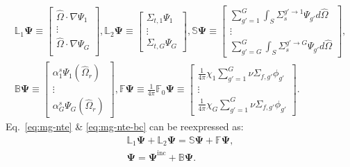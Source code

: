 \documentclass[letterpaper]{mc2025}
\begin{document}
\begin{gather}
  \mathbb{L}_1\bm{\Psi} \equiv
  \begin{bmatrix}
    \hat{\Omega}\cdot\nabla\Psi_1 \\
    \vdots \\
    \hat{\Omega}\cdot\nabla\Psi_G \\
  \end{bmatrix},
  \mathbb{L}_2\bm{\Psi} \equiv
  \begin{bmatrix}
    \Sigma_{t,1}\Psi_1 \\
    \vdots \\
    \Sigma_{t,G}\Psi_G
  \end{bmatrix},
  \mathbb{S}\bm{\Psi} \equiv
  \begin{bmatrix}
    \sum^G_{g'=1}\int_S \Sigma_s^{g'\rightarrow 1}\Psi_{g'}d\hat{\Omega} \\
    \vdots \\
    \sum^G_{g'=G}\int_S \Sigma_s^{g'\rightarrow G}\Psi_{g'}d\hat{\Omega}
  \end{bmatrix}, \nonumber \\
  \mathbb{B}\bm{\Psi} \equiv
  \begin{bmatrix}
    \alpha^s_1\Psi_1(\hat{\Omega}_r) \\
    \vdots \\
    \alpha^s_G\Psi_G(\hat{\Omega}_r)
  \end{bmatrix},
  \mathbb{F}\bm{\Psi} \equiv \frac{1}{4\pi}\mathbb{F}_0\bm{\Psi} \equiv
  \begin{bmatrix}
    \frac{1}{4\pi}\chi_{1}\sum^G_{g'=1}\nu\Sigma_{f,g'}\phi_{g'} \\
    \vdots \\
    \frac{1}{4\pi}\chi_{G}\sum^G_{g'=1}\nu\Sigma_{f,g'}\phi_{g'}
  \end{bmatrix}.
\end{gather}
%
Eq.\ \ref{eq:mg-nte} \& \ref{eq:mg-nte-bc} can be reexpressed as:
%
\begin{gather}
  \mathbb{L}_1\bm{\Psi} + \mathbb{L}_2\bm{\Psi} = \mathbb{S}\bm{\Psi} + \mathbb{F}\bm{\Psi}, \label{eq:nte-vec} \\
  \bm{\Psi} = \bm{\Psi}^\text{inc} + \mathbb{B}\bm{\Psi}.
\end{gather}
\end{document}
